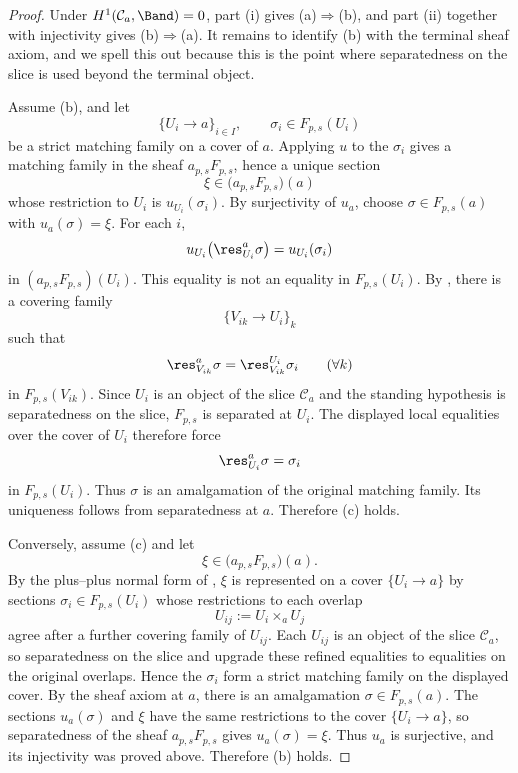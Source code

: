\begin{proof}
Under $H^1(\mathcal C_a,\Band)=0$, part \textup{(i)} gives
\textup{(a)}$\Rightarrow$\textup{(b)}, and part \textup{(ii)} together
with injectivity gives \textup{(b)}$\Rightarrow$\textup{(a)}. It remains
to identify \textup{(b)} with the terminal sheaf axiom, and we spell this
out because this is the point where separatedness on the slice is
used beyond the terminal object.

Assume \textup{(b)}, and let
\[
\{U_i\to a\}_{i\in I},
\qquad
\sigma_i\in F_{p,s}(U_i)
\]
be a strict matching family on a cover of \(a\). Applying \(u\) to the
\(\sigma_i\) gives a matching family in the sheaf
\(a_{p,s}F_{p,s}\), hence a unique section
\[
\xi\in \bigl(a_{p,s}F_{p,s}\bigr)(a)
\]
whose restriction to \(U_i\) is \(u_{U_i}(\sigma_i)\). By surjectivity of
\(u_a\), choose \(\sigma\in F_{p,s}(a)\) with \(u_a(\sigma)=\xi\). For
each \(i\),
\[
u_{U_i}\bigl(\res_{U_i}^{a}\sigma\bigr)=u_{U_i}(\sigma_i)
\]
in \((a_{p,s}F_{p,s})(U_i)\). This equality is not an equality in
\(F_{p,s}(U_i)\). By ,
there is a covering family
\[
\{V_{ik}\to U_i\}_{k}
\]
such that
\[
\res_{V_{ik}}^{a}\sigma=\res_{V_{ik}}^{U_i}\sigma_i
\qquad(\forall k)
\]
in \(F_{p,s}(V_{ik})\). Since \(U_i\) is an object of the slice
\(\mathcal C_a\) and the standing hypothesis is separatedness on the slice,
\(F_{p,s}\) is separated at \(U_i\). The displayed local equalities over
the cover of \(U_i\) therefore force
\[
\res_{U_i}^{a}\sigma=\sigma_i
\]
in \(F_{p,s}(U_i)\). Thus \(\sigma\) is an amalgamation of the original
matching family. Its uniqueness follows from separatedness at \(a\).
Therefore \textup{(c)} holds.

Conversely, assume \textup{(c)} and let
\[
\xi\in \bigl(a_{p,s}F_{p,s}\bigr)(a).
\]
By the plus--plus normal form of
, \(\xi\) is represented
on a cover \(\{U_i\to a\}\) by sections
\(\sigma_i\in F_{p,s}(U_i)\) whose restrictions to each overlap
\[
U_{ij}:=U_i\times_aU_j
\]
agree after a further covering family of \(U_{ij}\). Each \(U_{ij}\) is an
object of the slice \(\mathcal C_a\), so separatedness on the slice and
 upgrade these refined
equalities to equalities on the original overlaps. Hence the
\(\sigma_i\) form a strict matching family on the displayed cover. By the
sheaf axiom at \(a\), there is an amalgamation
\(\sigma\in F_{p,s}(a)\). The sections \(u_a(\sigma)\) and \(\xi\) have
the same restrictions to the cover \(\{U_i\to a\}\), so separatedness of
the sheaf \(a_{p,s}F_{p,s}\) gives \(u_a(\sigma)=\xi\). Thus \(u_a\) is
surjective, and its injectivity was proved above. Therefore
\textup{(b)} holds.
\end{proof}

